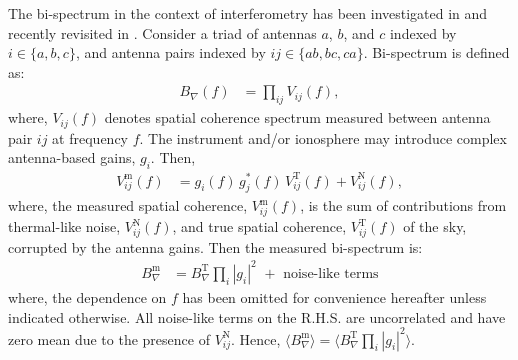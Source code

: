 \documentclass[
reprint,
superscriptaddress,
amsmath,
amssymb,
aps,
prd
]{revtex4-1}
\begin{document}
The bi-spectrum in the context of interferometry has been investigated in \cite{jen58,kul89,tay99,tho01,mon06} and recently revisited in \cite{car18}. Consider a triad of antennas $a$, $b$, and $c$ indexed by $i\in \{a, b, c\}$, and antenna pairs indexed by $ij\in \{ab, bc, ca\}$. Bi-spectrum is defined as:
\begin{align}
  B_\nabla(f) &= \prod_{ij} V_{ij}(f),
\end{align}
where, $V_{ij}(f)$ denotes spatial coherence spectrum measured between antenna pair $ij$ at frequency $f$. The instrument and/or ionosphere may introduce complex antenna-based gains, $g_i$. Then, 
\begin{align}\label{eqn:vis-antgains}
  V_{ij}^\textrm{m}(f) &= g_i(f)\, g_j^*(f)\, V_{ij}^\textrm{T}(f) + V_{ij}^\textrm{N}(f),
\end{align}
where, the measured spatial coherence, $V_{ij}^\textrm{m}(f)$, is the sum of contributions from thermal-like noise, $V_{ij}^\textrm{N}(f)$, and true spatial coherence, $V_{ij}^\textrm{T}(f)$ of the sky, corrupted by the antenna gains. Then the measured bi-spectrum is:
\begin{align}\label{eqn:bispectrum-terms}
  B_\nabla^\textrm{m} &= B_\nabla^\textrm{T}\prod_i |g_i|^2 \,\, + \,\, \textrm{noise-like terms}
\end{align}
where, the dependence on $f$ has been omitted for convenience hereafter unless indicated otherwise.
All noise-like terms on the R.H.S. are uncorrelated and have zero mean due to the presence of $V_{ij}^\textrm{N}$.
Hence, $\langle B_\nabla^\textrm{m}\rangle = \langle B_\nabla^\textrm{T} \prod_i |g_i|^2 \rangle$.
\end{document}

